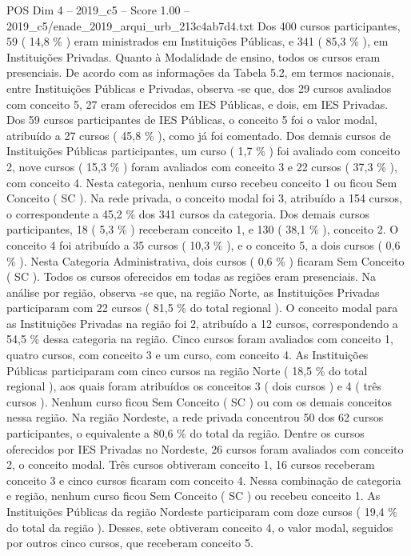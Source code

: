 \begin{textsample}{POS Dim 4 – 2019\_c5 – Score 1.00 – 2019\_c5/enade\_2019\_arqui\_urb\_213c4ab7d4.txt}
Dos 400 cursos participantes, 59 ( 14,8 \% ) eram ministrados em Instituições Públicas, e 341 ( 85,3 \% ), em Instituições Privadas.
Quanto à Modalidade de ensino, todos os cursos eram presenciais.
De acordo com as informações da Tabela 5.2, em termos nacionais, entre Instituições Públicas e Privadas, observa -se que, dos 29 cursos avaliados com conceito 5, 27 eram oferecidos em IES Públicas, e dois, em IES Privadas.
Dos 59 cursos participantes de IES Públicas, o conceito 5 foi o valor modal, atribuído a 27 cursos ( 45,8 \% ), como já foi comentado.
Dos demais cursos de Instituições Públicas participantes, um curso ( 1,7 \% ) foi avaliado com conceito 2, nove cursos ( 15,3 \% ) foram avaliados com conceito 3 e 22 cursos ( 37,3 \% ), com conceito 4.
Nesta categoria, nenhum curso recebeu conceito 1 ou ficou Sem Conceito ( SC ).
Na rede privada, o conceito modal foi 3, atribuído a 154 cursos, o correspondente a 45,2 \% dos 341 cursos da categoria.
Dos demais cursos participantes, 18 ( 5,3 \% ) receberam conceito 1, e 130 ( 38,1 \% ), conceito 2.
O conceito 4 foi atribuído a 35 cursos ( 10,3 \% ), e o conceito 5, a dois cursos ( 0,6 \% ).
Nesta Categoria Administrativa, dois cursos ( 0,6 \% ) ficaram Sem Conceito ( SC ).
Todos os cursos oferecidos em todas as regiões eram presenciais.
Na análise por região, observa -se que, na região Norte, as Instituições Privadas participaram com 22 cursos ( 81,5 \% do total regional ).
O conceito modal para as Instituições Privadas na região foi 2, atribuído a 12 cursos, correspondendo a 54,5 \% dessa categoria na região.
Cinco cursos foram avaliados com conceito 1, quatro cursos, com conceito 3 e um curso, com conceito 4.
As Instituições Públicas participaram com cinco cursos na região Norte ( 18,5 \% do total regional ), aos quais foram atribuídos os conceitos 3 ( dois cursos ) e 4 ( três cursos ).
Nenhum curso ficou Sem Conceito ( SC ) ou com os demais conceitos nessa região.
Na região Nordeste, a rede privada concentrou 50 dos 62 cursos participantes, o equivalente a 80,6 \% do total da região.
Dentre os cursos oferecidos por IES Privadas no Nordeste, 26 cursos foram avaliados com conceito 2, o conceito modal.
Três cursos obtiveram conceito 1, 16 cursos receberam conceito 3 e cinco cursos ficaram com conceito 4.
Nessa combinação de categoria e região, nenhum curso ficou Sem Conceito ( SC ) ou recebeu conceito 1.
As Instituições Públicas da região Nordeste participaram com doze cursos ( 19,4 \% do total da região ).
Desses, sete obtiveram conceito 4, o valor modal, seguidos por outros cinco cursos, que receberam conceito 5.

\end{textsample}
